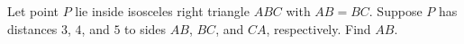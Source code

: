 Let point $P$ lie inside isosceles right triangle $ABC$ with $AB=BC$. Suppose $P$ has distances $3$, $4$, and $5$ to sides $AB$, $BC$, and $CA$, respectively. Find $AB$.
